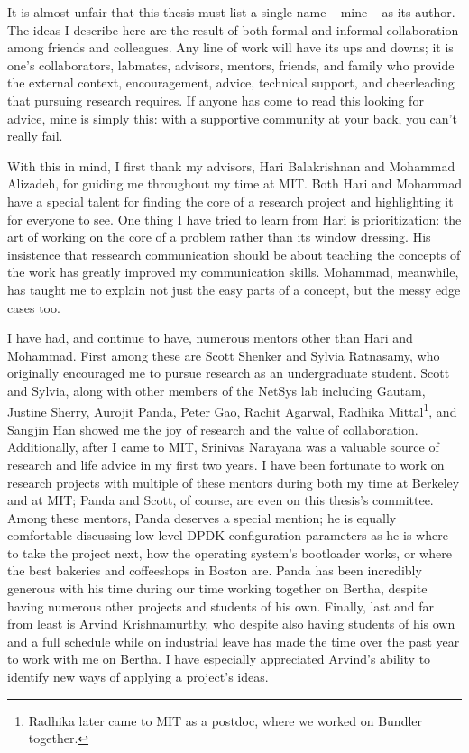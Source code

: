 It is almost unfair that this thesis must list a single name -- \ie mine -- as its author. The ideas I describe here are the result of both formal and informal collaboration among friends and colleagues.
Any line of work will have its ups and downs; it is one's collaborators, labmates, advisors, mentors, friends, and family who provide the external context, encouragement, advice, technical support, and cheerleading that pursuing research requires. 
If anyone has come to read this looking for advice, mine is simply this: with a supportive community at your back, you can't really fail.

With this in mind, I first thank my advisors, Hari Balakrishnan and Mohammad Alizadeh, for guiding me throughout my time at MIT. Both Hari and Mohammad have a special talent for finding the core of a research project and highlighting it for everyone to see. 
One thing I have tried to learn from Hari is prioritization: the art of working on the core of a problem rather than its window dressing.
His insistence that ressearch communication should be about teaching the concepts of the work has greatly improved my communication skills.
Mohammad, meanwhile, has taught me to explain not just the easy parts of a concept, but the messy edge cases too.

I have had, and continue to have, numerous mentors other than Hari and Mohammad. First among these are Scott Shenker and Sylvia Ratnasamy, who originally encouraged me to pursue research as an undergraduate student. Scott and Sylvia, along with other members of the NetSys lab including Gautam, Justine Sherry, Aurojit Panda, Peter Gao, Rachit Agarwal, Radhika Mittal\footnote{Radhika later came to MIT as a postdoc, where we worked on Bundler together.}, and Sangjin Han showed me the joy of research and the value of collaboration. 
Additionally, after I came to MIT, Srinivas Narayana was a valuable source of research and life advice in my first two years.
I have been fortunate to work on research projects with multiple of these mentors during both my time at Berkeley and at MIT; Panda and Scott, of course, are even on this thesis's committee.
Among these mentors, Panda deserves a special mention; he is equally comfortable discussing low-level DPDK configuration parameters as he is where to take the project next, how the operating system's bootloader works, or where the best bakeries and coffeeshops in Boston are. 
Panda has been incredibly generous with his time during our time working together on Bertha, despite having numerous other projects and students of his own.
Finally, last and far from least is Arvind Krishnamurthy, who despite also having students of his own and a full schedule while on industrial leave has made the time over the past year to work with me on Bertha. I have especially appreciated Arvind's ability to identify new ways of applying a project's ideas.

